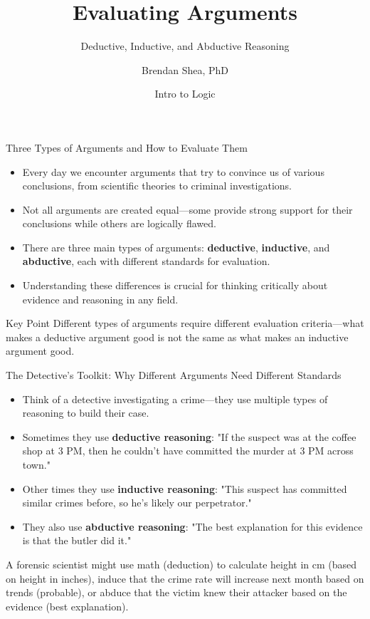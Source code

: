 \documentclass{beamer}
\title{Evaluating Arguments}
\subtitle{Deductive, Inductive, and Abductive Reasoning}
\author{Brendan Shea, PhD}
\date{Intro to Logic}
\begin{document}
	
	\frame{\titlepage}
	
	\begin{frame}{Three Types of Arguments and How to Evaluate Them}
		\begin{itemize}
			\item Every day we encounter arguments that try to convince us of various conclusions, from scientific theories to criminal investigations.
			\item Not all arguments are created equal—some provide strong support for their conclusions while others are logically flawed.
			\item There are three main types of arguments: \textbf{deductive}, \textbf{inductive}, and \textbf{abductive}, each with different standards for evaluation.
			\item Understanding these differences is crucial for thinking critically about evidence and reasoning in any field.
		\end{itemize}
		
		\begin{alertblock}{Key Point}
			Different types of arguments require different evaluation criteria—what makes a deductive argument good is not the same as what makes an inductive argument good.
		\end{alertblock}
	\end{frame}
	
	\begin{frame}{The Detective's Toolkit: Why Different Arguments Need Different Standards}
		\begin{itemize}
			\item Think of a detective investigating a crime—they use multiple types of reasoning to build their case.
			\item Sometimes they use \textbf{deductive reasoning}: "If the suspect was at the coffee shop at 3 PM, then he couldn't have committed the murder at 3 PM across town."
			\item Other times they use \textbf{inductive reasoning}: "This suspect has committed similar crimes before, so he's likely our perpetrator."
			\item They also use \textbf{abductive reasoning}: "The best explanation for this evidence is that the butler did it."
		\end{itemize}
		
		\begin{example}
			A forensic scientist might use math (deduction) to calculate height in cm (based on height in inches), induce that the crime rate will increase next month based on trends (probable), or abduce that the victim knew their attacker based on the evidence (best explanation).
		\end{example}
	\end{frame}
	
\end{document}
